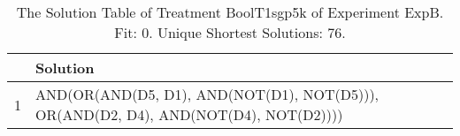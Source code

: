 \begin{table}[ht]
\centering
\begin{tabular}{rp{9cm}}
  \hline
 & Solution \\ 
  \hline
1 & AND(OR(AND(D5, D1), AND(NOT(D1), NOT(D5))), OR(AND(D2, D4), AND(NOT(D4), NOT(D2)))) \\ 
   \hline
\end{tabular}
\caption{The Solution Table of Treatment BoolT1sgp5k of Experiment ExpB. Fit: 0. Unique Shortest Solutions: 76.} 
\end{table}
